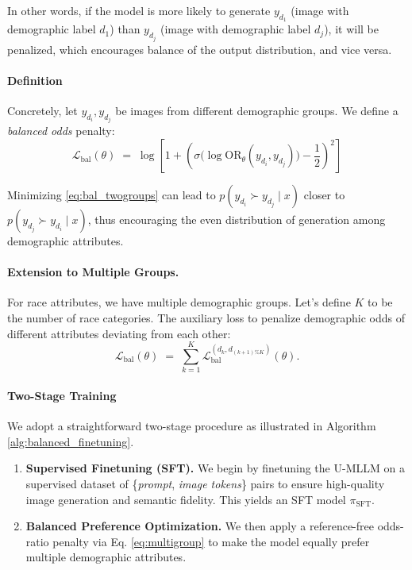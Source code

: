 In other words, if the model is more likely to generate $y_{d_1}$ (image with demographic label $d_1$) than $y_{d_j}$ (image with demographic label $d_j$), it will be penalized, which encourages balance of the output distribution, and vice versa.

\paragraph{Definition} Concretely, let $y_{d_i}, y_{d_j}$ be images from different demographic groups. We define a \emph{balanced odds} penalty:
\begin{equation}
  \mathcal{L}_{\mathrm{bal}}(\theta)
  \;=\;
  \log\left[ 1 + \left( 
    \sigma\!\Biggl(
      \log\text{OR}_\theta(y_{d_i}, y_{d_j}) 
    \Biggr) - \frac{1}{2} \right)^2 \right]
  \label{eq:bal_twogroups}
\end{equation}

Minimizing \eqref{eq:bal_twogroups} can lead to $p(y_{d_i} \succ y_{d_j} \mid x)$ closer to $p(y_{d_j} \succ y_{d_i} \mid x)$, thus encouraging the even distribution of generation among demographic attributes. 

\paragraph{Extension to Multiple Groups.}  
For race attributes, we have multiple demographic groups. Let's define $K$ to be the number of race categories. The auxiliary loss to penalize demographic odds of different attributes deviating from each other:
\begin{equation}
  \mathcal{L}_{\mathrm{bal}}(\theta)
  \;=\;
  \sum_{k=1}^{K}
  \mathcal{L}_{\mathrm{bal}}^{(d_{k},d_{(k+1) \% K})}(\theta).
  \label{eq:multigroup}
\end{equation}


\paragraph{Two-Stage Training} We adopt a straightforward two-stage procedure as illustrated in Algorithm  \ref{alg:balanced_finetuning}.
\begin{enumerate}[leftmargin=1em]
    \item \textbf{Supervised Finetuning (SFT).} 
    We begin by finetuning the U-MLLM on a supervised dataset of \{\emph{prompt}, \emph{image tokens}\} pairs to ensure high-quality image generation and semantic fidelity. This yields an SFT model $\pi_{\text{SFT}}$.
    \item \textbf{Balanced Preference Optimization.} 
    We then apply a reference-free odds-ratio penalty via Eq. \ref{eq:multigroup} to make the model equally prefer multiple demographic attributes.   
\end{enumerate}

